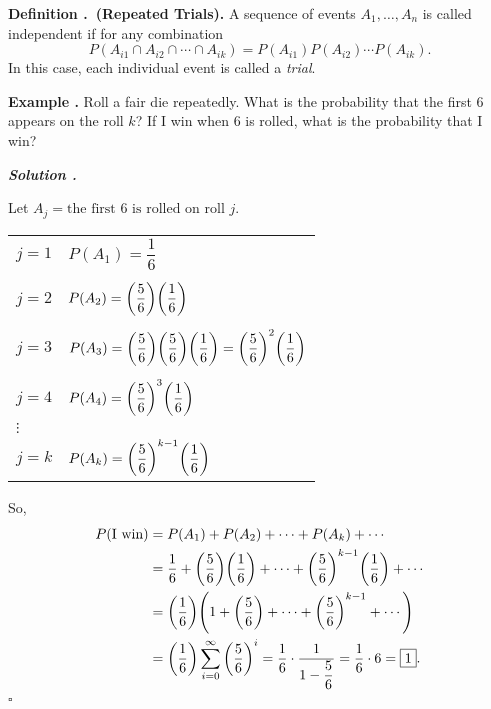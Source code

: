 \documentclass[12pt, a4paper]{article}
\newcounter{index}[subsection]
\newenvironment*{df}[1]{\par\noindent\textbf{Definition \thesubsection.\stepcounter{index}\theindex\ (#1).}}{\par}
\newenvironment*{eg}{\begin{framed}\par\noindent\textbf{Example \thesubsection.\stepcounter{index}\theindex}}{\par\end{framed}}
\newcounter{nprf}[subsection]
\newenvironment*{sol}{\par\indent\textbf{\textit{Solution \stepcounter{nprf}\thenprf.}}\par}{\hfill{$\square$}\par}
\begin{document}
\begin{df}{Repeated Trials}
	A sequence of events $A_1,\dots,A_n$ is called independent if for any combination \[P(A_{i1}\cap A_{i2}\cap\cdots\cap A_{ik})=P(A_{i1})P(A_{i2})\cdots P(A_{ik}).\] In this case, each individual event is  called a \textit{trial}.
\end{df}
\begin{eg}{}
	Roll a fair die repeatedly. What is the probability that the first $6$ appears on the roll $k$? If I win when $6$ is rolled, what is the probability that I win? 
	\begin{sol}
		Let $A_j=\text{the first }6\text{ is rolled on roll }j$.
		\begin{center}\begin{tabular}{ll}
		$j=1$&$P(A_1)=\dfrac{1}{6}$\\\\
		$j=2$&$P(A_2)=\qty(\dfrac{5}{6})\qty(\dfrac{1}{6})$\\\\
		$j=3$&$P(A_3)=\qty(\dfrac{5}{6})\qty(\dfrac{5}{6})\qty(\dfrac{1}{6})=\qty(\dfrac{5}{6})^2\qty(\dfrac{1}{6})$\\\\
		$j=4$&$P(A_4)=\qty(\dfrac{5}{6})^3\qty(\dfrac{1}{6})$\\
		$\vdots$&\\
		$j=k$&$P(A_k)=\qty(\dfrac{5}{6})^{k-1}\qty(\dfrac{1}{6})$
		\end{tabular}\end{center}
		So, \[\begin{aligned}P(\text{I win})&=P(A_1)+P(A_2)+\cdots+P(A_k)+\cdots\\&=\dfrac{1}{6}+\qty(\dfrac{5}{6})\qty(\dfrac{1}{6})+\cdots+\qty(\dfrac{5}{6})^{k-1}\qty(\dfrac{1}{6})+\cdots\\&=\qty(\dfrac{1}{6})\qty(1+\qty(\dfrac{5}{6})+\cdots+\qty(\dfrac{5}{6})^{k-1}+\cdots)\\&=\qty(\dfrac{1}{6})\sum_{i=0}^\infty\qty(\dfrac{5}{6})^i=\dfrac{1}{6}\cdot\dfrac{1}{1-\dfrac{5}{6}}=\dfrac{1}{6}\cdot6=\boxed{1}.\end{aligned}\]
	\end{sol}
\end{eg}
\end{document}
